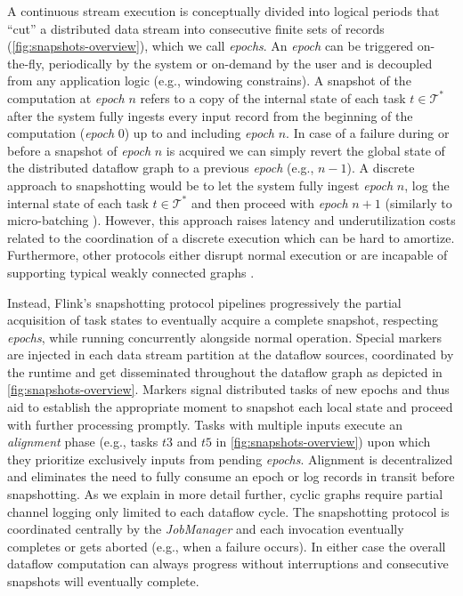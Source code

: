 A continuous stream execution is conceptually divided into logical periods that ``cut'' a distributed data stream into consecutive finite sets of records (\autoref{fig:snapshots-overview}), which we call \emph{epochs}. An \emph{epoch} can be triggered on-the-fly, periodically by the system or on-demand by the user and is decoupled from any application logic (e.g., windowing constrains). A snapshot of the computation at \emph{epoch} $n$ refers to a copy of the internal state of each task $t \in \mathcal{T^*}$ after the system fully ingests every input record from the beginning of the computation (\emph{epoch} 0) up to and including \emph{epoch} $n$. In case of a failure during or before a snapshot of \emph{epoch} $n$ is acquired we can simply revert the global state of the distributed dataflow graph to a previous \emph{epoch} (e.g., $n-1$). A discrete approach to snapshotting would be to let the system fully ingest \emph{epoch} $n$, log the internal state of each task $t \in \mathcal{T^*}$ and then proceed with \emph{epoch} $n+1$ (similarly to micro-batching \cite{zaharia2012discretized}). However, this approach raises latency and underutilization costs related to the coordination of a discrete execution which can be hard to amortize. Furthermore, other protocols either disrupt normal execution \cite{murray2013naiad,jacques2016consistent} or are incapable of supporting typical weakly connected graphs \cite{chandy1985distributed}.

Instead, Flink's snapshotting protocol pipelines progressively the partial acquisition of task states to eventually acquire a complete snapshot, respecting \emph{epochs}, while running concurrently alongside normal operation. Special markers are injected in each data stream partition at the dataflow sources, coordinated by the runtime and get disseminated throughout the dataflow graph as depicted in \autoref{fig:snapshots-overview}. Markers signal distributed tasks of new epochs and thus aid to establish the appropriate moment to snapshot each local state and proceed with further processing promptly. Tasks with multiple inputs execute an \emph{alignment} phase (e.g., tasks $t3$ and $t5$ in \autoref{fig:snapshots-overview}) upon which they prioritize exclusively inputs from pending \emph{epochs}. Alignment is decentralized and eliminates the need to fully consume an epoch or log records in transit before snapshotting. As we explain in more detail further, cyclic graphs require partial channel logging only limited to each dataflow cycle. The snapshotting protocol is coordinated centrally by the \emph{JobManager} and each invocation eventually completes or gets aborted (e.g., when a failure occurs). In either case the overall dataflow computation can always progress without interruptions and consecutive snapshots will eventually complete.

